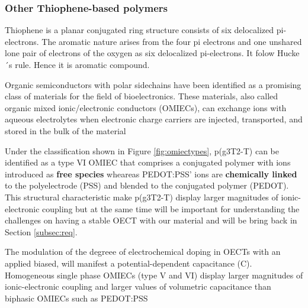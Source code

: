 \subsubsection{Other Thiophene-based polymers}
Thiophene is a planar conjugated ring structure consists of six delocalized pi-electrons. The aromatic nature arises from the four pi electrons and one unshared lone pair of electrons of the oxygen as six delocalized pi-electrons. It folow Hucke´s rule. Hence it is aromatic compound.

Organic semiconductors with polar sidechains have been identified as a promising class of materials for the field of bioelectronics. These materials, also called organic mixed ionic/electronic conductors (OMIECs), can exchange ions with aqueous electrolytes when electronic charge carriers are injected, transported, and stored in the bulk of the material \cite{giovannittiEnergeticControlRedoxActive2020}


Under the classification shown in Figure \ref{fig:omiectypes}, p(g3T2-T) can be identified as a type VI OMIEC that comprises a conjugated polymer with ions introduced as \textbf{free species} wheareas PEDOT:PSS' ions are \textbf{chemically linked} to the polyelectrode (PSS) and blended to the conjugated polymer (PEDOT). This structural characteristic make p(g3T2-T) display larger magnitudes of ionic-electronic coupling but at the same time will be important for understanding the challenges on having a stable OECT with our material and will be bring back in Section \ref{subsec:req}.


The modulation of the degreee of electrochemical doping in OECTs with an applied biased, will manifest a potential-dependent capacitance (C). Homogeneous single phase OMIECs (type V and VI) display larger magnitudes of ionic-electronic coupling and larger values of volumetric capacitance than biphasic OMIECs such as PEDOT:PSS \cite{inalBenchmarkingOrganicMixed2017}



